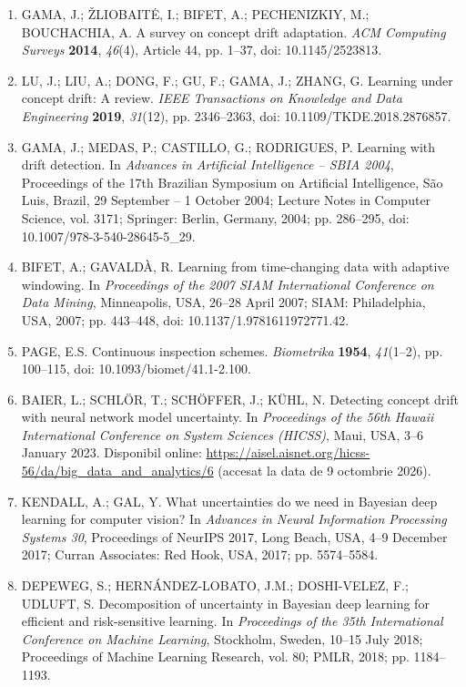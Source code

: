 \documentclass[12pt,a4paper]{article}
\begin{document}
{\raggedright
\begin{enumerate}[label=\arabic*.,leftmargin=1cm,labelsep=0.25cm,itemsep=0pt,parsep=0pt,topsep=2pt,align=left]
\item GAMA, J.; ŽLIOBAITĖ, I.; BIFET, A.; PECHENIZKIY, M.; BOUCHACHIA, A. A survey on concept drift adaptation. \textit{ACM Computing Surveys} \textbf{2014}, \textit{46}(4), Article 44, pp. 1–37, doi: 10.1145/2523813.
\item LU, J.; LIU, A.; DONG, F.; GU, F.; GAMA, J.; ZHANG, G. Learning under concept drift: A review. \textit{IEEE Transactions on Knowledge and Data Engineering} \textbf{2019}, \textit{31}(12), pp. 2346–2363, doi: 10.1109/TKDE.2018.2876857.
\item GAMA, J.; MEDAS, P.; CASTILLO, G.; RODRIGUES, P. Learning with drift detection. In \textit{Advances in Artificial Intelligence – SBIA 2004}, Proceedings of the 17th Brazilian Symposium on Artificial Intelligence, São Luis, Brazil, 29 September – 1 October 2004; Lecture Notes in Computer Science, vol. 3171; Springer: Berlin, Germany, 2004; pp. 286–295, doi: 10.1007/978-3-540-28645-5\_29.
\item BIFET, A.; GAVALDÀ, R. Learning from time-changing data with adaptive windowing. In \textit{Proceedings of the 2007 SIAM International Conference on Data Mining}, Minneapolis, USA, 26–28 April 2007; SIAM: Philadelphia, USA, 2007; pp. 443–448, doi: 10.1137/1.9781611972771.42.
\item PAGE, E.S. Continuous inspection schemes. \textit{Biometrika} \textbf{1954}, \textit{41}(1–2), pp. 100–115, doi: 10.1093/biomet/41.1-2.100.
\item BAIER, L.; SCHLÖR, T.; SCHÖFFER, J.; KÜHL, N. Detecting concept drift with neural network model uncertainty. In \textit{Proceedings of the 56th Hawaii International Conference on System Sciences (HICSS)}, Maui, USA, 3–6 January 2023. Disponibil online: \url{https://aisel.aisnet.org/hicss-56/da/big_data_and_analytics/6} (accesat la data de 9 octombrie 2026).
\item KENDALL, A.; GAL, Y. What uncertainties do we need in Bayesian deep learning for computer vision? In \textit{Advances in Neural Information Processing Systems 30}, Proceedings of NeurIPS 2017, Long Beach, USA, 4–9 December 2017; Curran Associates: Red Hook, USA, 2017; pp. 5574–5584.
\item DEPEWEG, S.; HERNÁNDEZ-LOBATO, J.M.; DOSHI-VELEZ, F.; UDLUFT, S. Decomposition of uncertainty in Bayesian deep learning for efficient and risk-sensitive learning. In \textit{Proceedings of the 35th International Conference on Machine Learning}, Stockholm, Sweden, 10–15 July 2018; Proceedings of Machine Learning Research, vol. 80; PMLR, 2018; pp. 1184–1193.

\end{enumerate}}
\end{document}

